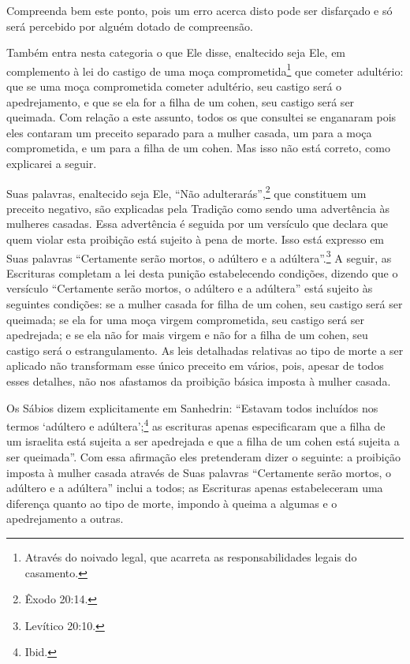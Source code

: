 Compreenda bem este ponto, pois um erro acerca disto pode ser disfarçado
e só será percebido por alguém dotado de compreensão.

Também entra nesta categoria o que Ele disse, enaltecido seja Ele,
em complemento à lei do castigo de uma moça
comprometida\footnote{Através do noivado legal, que acarreta as responsabilidades legais
do casamento.} que cometer adultério: que se uma moça
comprometida cometer adultério, seu castigo será
o apedrejamento, e que se ela for a filha de um cohen\starr, seu castigo
será ser
queimada. Com relação a este assunto, todos os que consultei se
enganaram pois eles contaram um preceito separado para a mulher casada,
um para a moça comprometida, e um para a filha de um cohen\starr. Mas isso
não está correto, como explicarei a seguir.

Suas palavras, enaltecido seja Ele, ``Não adulterarás'',\footnote{Êxodo 20:14.}
que constituem um preceito negativo, são explicadas pela Tradição como
sendo uma advertência às mulheres casadas. Essa advertência é seguida
por um versículo que declara que quem violar esta proibição está sujeito
à pena de morte. Isso está expresso em Suas palavras ``Certamente serão
mortos, o adúltero e a adúltera''.\footnote{Levítico 20:10.} A seguir, as
Escrituras completam a lei desta punição estabelecendo condições,
dizendo que o versículo ``Certamente serão mortos, o adúltero e a
adúltera'' está sujeito às seguintes condições: se a mulher casada for
filha de um cohen\starr, seu castigo será ser queimada; se ela for uma
moça virgem comprometida, seu castigo será ser apedrejada; e se ela não
for mais virgem e não for a filha de um cohen\starr, seu castigo será o
estrangulamento. As leis detalhadas relativas ao tipo de morte a ser
aplicado não transformam esse único preceito em vários, pois, apesar de
todos esses detalhes, não nos afastamos da proibição básica imposta à
mulher casada.

Os Sábios dizem explicitamente em Sanhedrin\starr: ``Estavam todos incluídos
nos termos `adúltero e adúltera';\footnote{Ibid.} as escrituras apenas
especificaram que a filha de um israelita está sujeita a ser apedrejada
e que a filha de um cohen\starr{} está sujeita a ser queimada''. Com essa
afirmação eles pretenderam dizer o seguinte: a proibição imposta à
mulher casada através de Suas palavras ``Certamente serão mortos, o
adúltero e a adúltera'' inclui a todos; as Escrituras apenas
estabeleceram uma diferença quanto ao tipo de morte, impondo à queima a
algumas e o apedrejamento a outras.

